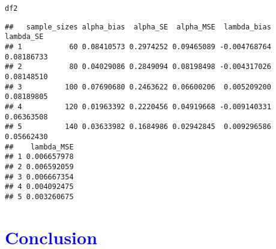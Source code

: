 \documentclass[11pt, a4paper]{article}\usepackage[]{graphicx}\usepackage[]{xcolor}
\makeatletter
\newcommand{\hldef}[1]{\textcolor[rgb]{0.345,0.345,0.345}{#1}}%
\newenvironment{kframe}{%
 \def\at@end@of@kframe{}%
 \ifinner\ifhmode%
  \def\at@end@of@kframe{\end{minipage}}%
  \begin{minipage}{\columnwidth}%
 \fi\fi%
 \def\FrameCommand##1{\hskip\@totalleftmargin \hskip-\fboxsep
 \colorbox{shadecolor}{##1}\hskip-\fboxsep
     \hskip-\linewidth \hskip-\@totalleftmargin \hskip\columnwidth}%
 \MakeFramed {\advance\hsize-\width
   \@totalleftmargin\z@ \linewidth\hsize
   \@setminipage}}%
 {\par\unskip\endMakeFramed%
 \at@end@of@kframe}
\newenvironment{knitrout}{}{} %
\makeatother
\begin{document}
\begin{knitrout}
\color{fgcolor}\begin{kframe}
\begin{alltt}
\hldef{df2}
\end{alltt}
\begin{verbatim}
##   sample_sizes alpha_bias  alpha_SE  alpha_MSE  lambda_bias  lambda_SE
## 1           60 0.08410573 0.2974252 0.09465089 -0.004768764 0.08186733
## 2           80 0.04029086 0.2849094 0.08198498 -0.004317026 0.08148510
## 3          100 0.07690680 0.2463622 0.06600206  0.005209200 0.08189805
## 4          120 0.01963392 0.2220456 0.04919668 -0.009140331 0.06363508
## 5          140 0.03633982 0.1684986 0.02942845  0.009296586 0.05662430
##    lambda_MSE
## 1 0.006657978
## 2 0.006592059
## 3 0.006667354
## 4 0.004092475
## 5 0.003260675
\end{verbatim}
\end{kframe}
\end{knitrout}

\section*{\faArrowAltCircleRight[regular] \textcolor{blue}{Conclusion}}

\end{document}
